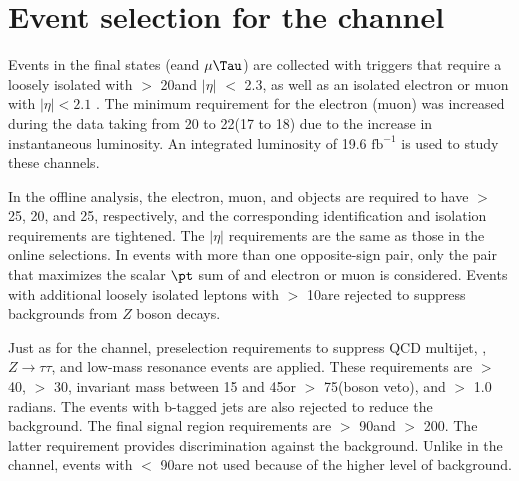 \section{\texorpdfstring{Event selection for the \leptonTau channel}{Event selection for the lepton-tau channel}}
\label{sect:eleTauCuts}
Events in the \leptonTau final states (e\Tau and $\mu\Tau$)
are collected with triggers that require 
a loosely isolated \Tau with \PT $>$ 20\GeV and $|\eta|$ $<$ 2.3, as well as
an isolated electron or muon with $|\eta| < 2.1$ \cite{Chatrchyan:2011nv,Khachatryan:2015hwa,Chatrchyan:2012xi}.  The minimum
\PT requirement for the electron (muon) was increased during the data taking from 20 to 22\GeV (17 to 18\GeV)
due to the increase in instantaneous luminosity. An integrated luminosity of 19.6 $\mathrm{fb}^{-1}$ is used to study these channels.

In the offline analysis, the electron, muon, and \Tau objects are required to have \PT $>$ 25, 20, and 25\GeV, respectively, 
and the corresponding identification and isolation requirements are tightened. The $|\eta|$ requirements are the same as those in the online selections.
In events with more than one opposite-sign \leptonTau pair, only 
 the pair that maximizes the scalar $\pt$ sum of \Tau and electron or muon is considered.  Events with additional loosely isolated leptons
with \PT $>$ 10\GeV are rejected to suppress backgrounds from $Z$ boson
decays.  

Just as for the \tauTau channel, preselection requirements to suppress
QCD multijet, \ttbar, $Z \to \tau \tau$, and low-mass resonance events are applied.
These requirements are \mttwo $>$ 40\GeV, \MPT $>$ 30\GeV, \leptonTau 
invariant mass between 15 and 45\GeV or $>$ 75\GeV (\Z boson veto), and \deltaphi $>$ 1.0 radians. The events with b-tagged jets are also rejected to reduce the 
\ttbar background.
 The final signal region requirements are \mttwo $>$ 90\GeV and \tauMT $>$ 200\GeV. %
The latter requirement provides discrimination against the \wjets background.  Unlike in the \tauTau channel,
events with \mttwo $<$ 90\GeV are not used because of the higher 
level of background. 

